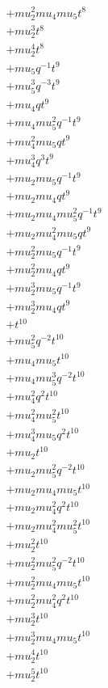\begin{align*}
  + mu_2^{2} mu_4 mu_5 t^{8} \\
  + mu_2^{3} t^{8} \\
  + mu_2^{4} t^{8} \\
  + mu_5 q^{-1} t^{9} \\
  + mu_5^{3} q^{-3} t^{9} \\
  + mu_4 q t^{9} \\
  + mu_4 mu_5^{2} q^{-1} t^{9} \\
  + mu_4^{2} mu_5 q t^{9} \\
  + mu_4^{3} q^{3} t^{9} \\
  + mu_2 mu_5 q^{-1} t^{9} \\
  + mu_2 mu_4 q t^{9} \\
  + mu_2 mu_4 mu_5^{2} q^{-1} t^{9} \\
  + mu_2 mu_4^{2} mu_5 q t^{9} \\
  + mu_2^{2} mu_5 q^{-1} t^{9} \\
  + mu_2^{2} mu_4 q t^{9} \\
  + mu_2^{3} mu_5 q^{-1} t^{9} \\
  + mu_2^{3} mu_4 q t^{9} \\
  + t^{10} \\
  + mu_5^{2} q^{-2} t^{10} \\
  + mu_4 mu_5 t^{10} \\
  + mu_4 mu_5^{3} q^{-2} t^{10} \\
  + mu_4^{2} q^{2} t^{10} \\
  + mu_4^{2} mu_5^{2} t^{10} \\
  + mu_4^{3} mu_5 q^{2} t^{10} \\
  + mu_2 t^{10} \\
  + mu_2 mu_5^{2} q^{-2} t^{10} \\
  + mu_2 mu_4 mu_5 t^{10} \\
  + mu_2 mu_4^{2} q^{2} t^{10} \\
  + mu_2 mu_4^{2} mu_5^{2} t^{10} \\
  + mu_2^{2} t^{10} \\
  + mu_2^{2} mu_5^{2} q^{-2} t^{10} \\
  + mu_2^{2} mu_4 mu_5 t^{10} \\
  + mu_2^{2} mu_4^{2} q^{2} t^{10} \\
  + mu_2^{3} t^{10} \\
  + mu_2^{3} mu_4 mu_5 t^{10} \\
  + mu_2^{4} t^{10} \\
  + mu_2^{5} t^{10}
\end{align*}
